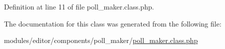 Definition at line 11 of file poll\+\_\+maker.\+class.\+php.



The documentation for this class was generated from the following file\+:\begin{DoxyCompactItemize}
\item 
modules/editor/components/poll\+\_\+maker/\hyperlink{poll__maker_8class_8php}{poll\+\_\+maker.\+class.\+php}\end{DoxyCompactItemize}
